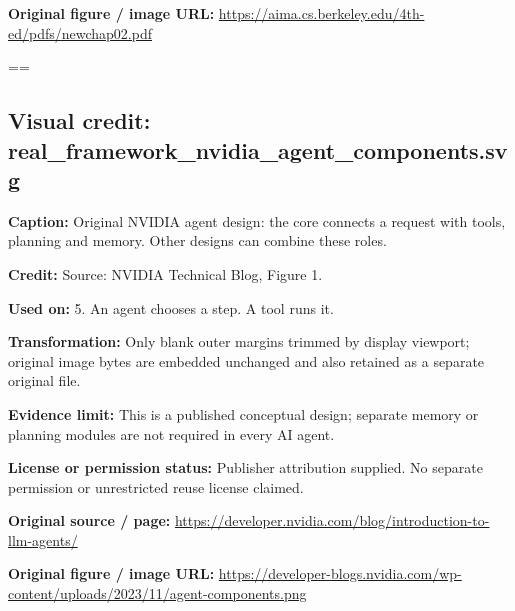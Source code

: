 \documentclass[10pt,letterpaper]{article}
\begin{document}
\textbf{Original figure / image URL:} \href{https://aima.cs.berkeley.edu/4th-ed/pdfs/newchap02.pdf}{\small\ttfamily https:/\allowbreak{}/\allowbreak{}aima.\allowbreak{}cs.\allowbreak{}berkeley.\allowbreak{}edu/\allowbreak{}4th-\allowbreak{}ed/\allowbreak{}pdfs/\allowbreak{}newchap02.\allowbreak{}pdf}\par
\egroup\par\noindent\box\readingEntry\par\medskip
\setbox\readingEntry=\vbox\bgroup\hsize=\linewidth\subsection*{Visual credit: real\_framework\_nvidia\_agent\_components.svg}
\textbf{Caption:} Original NVIDIA agent design: the core connects a request with tools, planning and memory. Other designs can combine these roles.\par
\textbf{Credit:} Source: NVIDIA Technical Blog, Figure 1.\par
\textbf{Used on:} 5. An agent chooses a step. A tool runs it.\par
\textbf{Transformation:} Only blank outer margins trimmed by display viewport; original image bytes are embedded unchanged and also retained as a separate original file.\par
\textbf{Evidence limit:} This is a published conceptual design; separate memory or planning modules are not required in every AI agent.\par
\textbf{License or permission status:} Publisher attribution supplied. No separate permission or unrestricted reuse license claimed.\par
\textbf{Original source / page:} \href{https://developer.nvidia.com/blog/introduction-to-llm-agents/}{\small\ttfamily https:/\allowbreak{}/\allowbreak{}developer.\allowbreak{}nvidia.\allowbreak{}com/\allowbreak{}blog/\allowbreak{}introduction-\allowbreak{}to-\allowbreak{}llm-\allowbreak{}agents/\allowbreak{}}\par
\textbf{Original figure / image URL:} \href{https://developer-blogs.nvidia.com/wp-content/uploads/2023/11/agent-components.png}{\small\ttfamily https:/\allowbreak{}/\allowbreak{}developer-\allowbreak{}blogs.\allowbreak{}nvidia.\allowbreak{}com/\allowbreak{}wp-\allowbreak{}content/\allowbreak{}uploads/\allowbreak{}2023/\allowbreak{}11/\allowbreak{}agent-\allowbreak{}components.\allowbreak{}png}\par
\egroup\par\noindent\box\readingEntry\par\medskip
\end{document}
